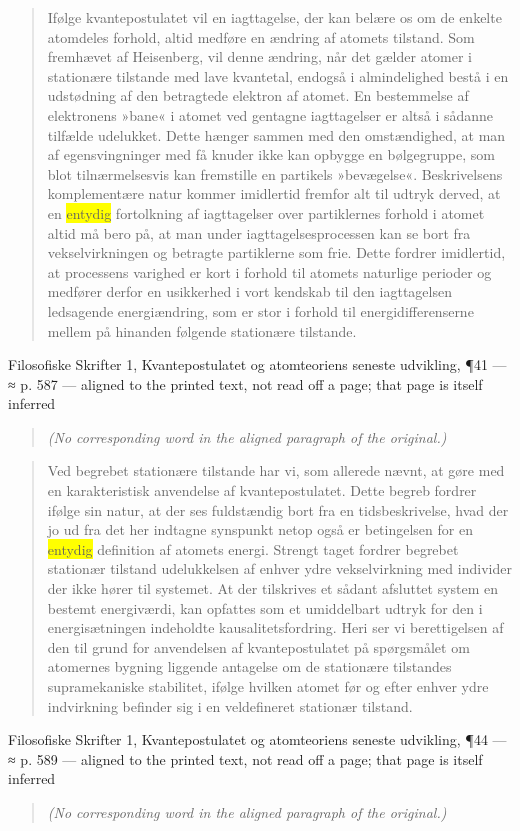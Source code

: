\documentclass[11pt]{article}
\newcommand{\dcite}[1]{{\nopagebreak\raggedleft\small #1\par}\medskip}
\newcommand{\tlg}[1]{{\setlength{\fboxsep}{0.8pt}\colorbox{yellow}{#1}}}
\begin{document}
\begin{quote}
Ifølge kvantepostulatet vil en iagttagelse, der kan belære os om de enkelte atomdeles forhold, altid medføre en ændring af atomets tilstand. Som fremhævet af Heisenberg, vil denne ændring, når det gælder atomer i stationære tilstande med lave kvantetal, endogså i almindelighed bestå i en udstødning af den betragtede elektron af atomet. En bestemmelse af elektronens »bane« i atomet ved gentagne iagttagelser er altså i sådanne tilfælde udelukket. Dette hænger sammen med den omstændighed, at man af egensvingninger med få knuder ikke kan opbygge en bølgegruppe, som blot tilnærmelsesvis kan fremstille en partikels »bevægelse«. Beskrivelsens komplementære natur kommer imidlertid fremfor alt til udtryk derved, at en \tlg{entydig} fortolkning af iagttagelser over partiklernes forhold i atomet altid må bero på, at man under iagttagelsesprocessen kan se bort fra vekselvirkningen og betragte partiklerne som frie. Dette fordrer imidlertid, at processens varighed er kort i forhold til atomets naturlige perioder og medfører derfor en usikkerhed i vort kendskab til den iagttagelsen ledsagende energiændring, som er stor i forhold til energidifferenserne mellem på hinanden følgende stationære tilstande.
\end{quote}
\dcite{Filosofiske Skrifter 1, Kvantepostulatet og atomteoriens seneste udvikling, ¶41 — ≈ p. 587 — aligned to the printed text, not read off a page; that page is itself inferred}
{\footnotesize\begin{quote}\itshape (No corresponding word in the aligned paragraph of the original.)\end{quote}}

\begin{quote}
Ved begrebet stationære tilstande har vi, som allerede nævnt, at gøre med en karakteristisk anvendelse af kvantepostulatet. Dette begreb fordrer ifølge sin natur, at der ses fuldstændig bort fra en tidsbeskrivelse, hvad der jo ud fra det her indtagne synspunkt netop også er betingelsen for en \tlg{entydig} definition af atomets energi. Strengt taget fordrer begrebet stationær tilstand udelukkelsen af enhver ydre vekselvirkning med individer der ikke hører til systemet. At der tilskrives et sådant afsluttet system en bestemt energiværdi, kan opfattes som et umiddelbart udtryk for den i energisætningen indeholdte kausalitetsfordring. Heri ser vi berettigelsen af den til grund for anvendelsen af kvantepostulatet på spørgsmålet om atomernes bygning liggende antagelse om de stationære tilstandes supramekaniske stabilitet, ifølge hvilken atomet før og efter enhver ydre indvirkning befinder sig i en veldefineret stationær tilstand.
\end{quote}
\dcite{Filosofiske Skrifter 1, Kvantepostulatet og atomteoriens seneste udvikling, ¶44 — ≈ p. 589 — aligned to the printed text, not read off a page; that page is itself inferred}
{\footnotesize\begin{quote}\itshape (No corresponding word in the aligned paragraph of the original.)\end{quote}}
\end{document}
